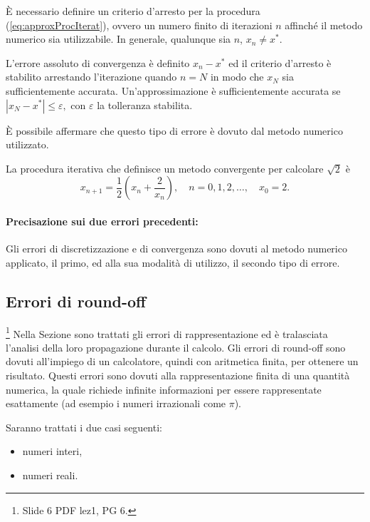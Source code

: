 È necessario definire un criterio d'arresto per la procedura (\ref{eq:approxProcIterat}), ovvero un numero finito di iterazioni $n$ affinché il metodo numerico sia utilizzabile. In generale, qualunque sia $n$, $x_n\neq x^*$.

L'errore assoluto di convergenza è definito $x_n-x^*$ ed il criterio d'arresto è stabilito arrestando l'iterazione quando $n=N$ in modo che $x_N$ sia sufficientemente accurata. Un'approssimazione è sufficientemente accurata se $|x_N-x^*|\leq\varepsilon,$ con $\varepsilon$ la tolleranza stabilita.

È possibile affermare che questo tipo di errore è dovuto dal metodo numerico utilizzato.

\begin{example}
    La procedura iterativa che definisce un metodo convergente per calcolare $\sqrt{2}$ è
    \begin{equation}\label{eq:approxRad2ProcIterat}
        x_{n+1}=\frac{1}{2}\left(x_n+\frac{2}{x_n}\right),\quad n=0,1,2,\hdots,\quad x_0=2.
    \end{equation}
\end{example}

\paragraph{Precisazione sui due errori precedenti:} Gli errori di discretizzazione e di convergenza sono dovuti al metodo numerico applicato, il primo, ed alla sua modalità di utilizzo, il secondo tipo di errore.

\subsection{Errori di round-off}\footnote{Slide 6 PDF lez1, PG 6.}
Nella Sezione sono trattati gli errori di rappresentazione ed è tralasciata l'analisi della loro propagazione durante il calcolo. Gli errori di round-off sono dovuti all'impiego di un calcolatore, quindi con aritmetica finita, per ottenere un risultato. Questi errori sono dovuti alla rappresentazione finita di una quantità numerica, la quale richiede infinite informazioni  per essere rappresentate esattamente (ad esempio i numeri irrazionali come $\pi$). 

Saranno trattati i due casi seguenti:
\begin{itemize}
    \item numeri interi,
    \item numeri reali.
\end{itemize}

